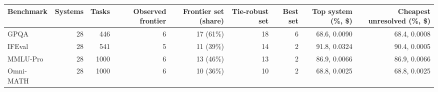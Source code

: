 \begin{tabular}{lrrrrrrrr}
\toprule
Benchmark & Systems & Tasks & Observed frontier & Frontier set (share) & Tie-robust set & Best set & Top system (\%, \$) & Cheapest unresolved (\%, \$) \\
\midrule
GPQA & 28 & 446 & 6 & 17 (61\%) & 18 & 6 & 68.6, 0.0090 & 68.4, 0.0008 \\
IFEval & 28 & 541 & 5 & 11 (39\%) & 14 & 2 & 91.8, 0.0324 & 90.4, 0.0005 \\
MMLU-Pro & 28 & 1000 & 6 & 13 (46\%) & 13 & 2 & 86.9, 0.0066 & 86.9, 0.0066 \\
Omni-MATH & 28 & 1000 & 6 & 10 (36\%) & 10 & 2 & 68.8, 0.0025 & 68.8, 0.0025 \\
\bottomrule
\end{tabular}
